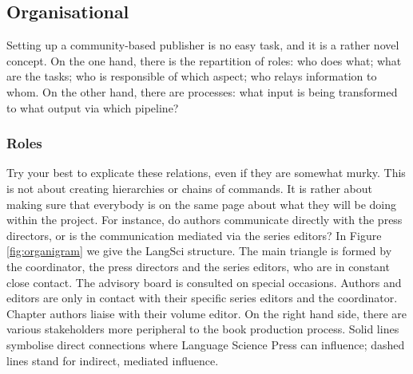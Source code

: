 \documentclass[guidelines,nonflat,modfonts] {langsci/langscibook}
\begin{document}
\subsection{Organisational}
Setting up a community-based publisher is no easy task, and it is a rather novel concept. On the one hand, there is the repartition of roles: who does what; what are the tasks; who is responsible of which aspect; who relays information to whom. On the other hand, there are processes: what input is being transformed to what output via which pipeline?

\subsubsection{Roles}

Try your best to explicate these relations, even if they are somewhat murky. This is not about creating hierarchies or chains of commands. It is rather about making sure that everybody is on the same page about what they will be doing within the project. For instance, do authors communicate directly with the press directors, or is the communication mediated via the series editors? In Figure \ref{fig:organigram} we give the LangSci structure. The main triangle is formed by the coordinator, the press directors and the series editors, who are in constant close contact. The advisory board is consulted on special occasions. Authors and editors are only in contact with their specific series editors and the coordinator. Chapter authors liaise with their volume editor. On the right hand side, there are various stakeholders more peripheral to the book production process. Solid lines symbolise direct connections where Language Science Press can influence; dashed lines stand for indirect, mediated influence.
\end{document}
